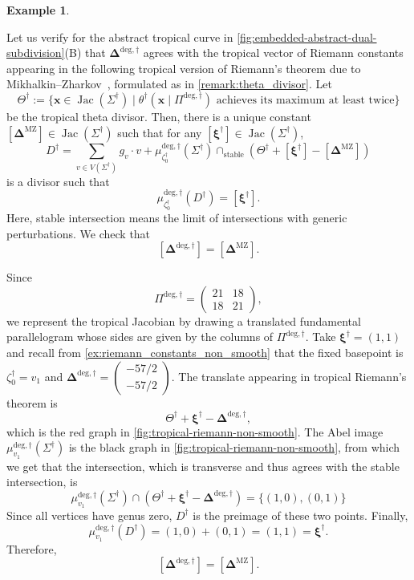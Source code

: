 \documentclass[12pt]{amsart}
\numberwithin{equation}{section}
\theoremstyle{definition}
\newtheorem{example}[theorem]{Example}
\newcommand{\R}{\mathbb{R}}
\def\vertices{V}
\def\divisor{D}
\def\trop{\dagger}
\def\jac{{\operatorname{Jac}}}
\def\divisor{D}
\def\vecRC{\bm{\Delta}}
\def\vecptjac{\bm{\xi}}
\def\ptR{{\bm{x}}} %
\def\Divtr{\divisor^{\trop}}
\def\ptSig{\zeta}
\def\baseptT{{\ptSig_0^\trop}}
\def\mcurve{\Sigma}
\def\tropmcurve{\mcurve^\trop}
\begin{document}
\begin{example}\label{ex:MZequalsours}

Let us verify for the abstract tropical curve in
\cref{fig:embedded-abstract-dual-subdivision}(B) that
$\vecRC^{\mathrm{deg},\trop}$ agrees with the tropical vector of
Riemann constants appearing in the following tropical version of
Riemann's theorem due to
Mikhalkin--Zharkov~\cite[Theorem~6.5]{MZ}, formulated as in \cref{remark:theta_divisor}.
Let
\[
\Theta^\trop
:=
\{
\ptR\in\jac(\tropmcurve)
\mid
\theta^\trop(\ptR\mid\Pi^{\mathrm{deg},\trop})
\text{ achieves its maximum at least twice}
\}
\]
be the tropical theta divisor. Then, there is a unique constant
$[\vecRC^{\mathrm{MZ}}] \in \jac(\tropmcurve)$ such that for any
$[\vecptjac^\trop]\in\jac(\tropmcurve)$,
\[
\Divtr
=
\sum_{v\in\vertices(\tropmcurve)}
g_v\cdot v
+
\mu^{\mathrm{deg},\trop}_{\baseptT}(\tropmcurve)
\cap_{\mathrm{stable}}
\left(
\Theta^\trop
+
[\vecptjac^\trop]
-
[\vecRC^{\mathrm{MZ}}]
\right)
\]
is a divisor such that
\[
\mu^{\mathrm{deg},\trop}_{\baseptT}(\Divtr)
=
[\vecptjac^\trop].
\]
Here, stable intersection means the limit of intersections with generic
perturbations. We check that
\[
[\vecRC^{\mathrm{deg},\trop}]
=
[\vecRC^{\mathrm{MZ}}].
\]

Since
\[
\Pi^{\mathrm{deg},\trop}
=
\begin{pmatrix}
21&18\\
18&21
\end{pmatrix},
\]
we represent the tropical Jacobian by drawing a translated fundamental
parallelogram whose sides are given by the columns of
$\Pi^{\mathrm{deg},\trop}$.
Take
$
\vecptjac^\trop=(1,1)
$
and recall from
\cref{ex:riemann_constants_non_smooth} that the fixed basepoint is
$\baseptT=v_1$ and
$
\vecRC^{\mathrm{deg},\trop}
=
\begin{pmatrix}
-{57}/{2}\\
-{57}/{2}
\end{pmatrix}.
$
The translate appearing in tropical Riemann's theorem is
\[
\Theta^\trop
+
\vecptjac^\trop
-
\vecRC^{\mathrm{deg},\trop},
\]
which is the red graph in
\cref{fig:tropical-riemann-non-smooth}.
The Abel image
$\mu_{v_1}^{\mathrm{deg},\trop}(\tropmcurve)$
is the black graph in
\cref{fig:tropical-riemann-non-smooth}, from which we get that the
intersection, which is transverse and thus agrees with the stable
intersection, is
\[
\mu_{v_1}^{\mathrm{deg},\trop}(\tropmcurve)
\cap
\left(
\Theta^\trop
+
\vecptjac^\trop
-
\vecRC^{\mathrm{deg},\trop}
\right)
=
\{
(1,0),(0,1)
\}
\]
Since all vertices have genus zero, $\Divtr$ is the preimage of these two points. Finally,
\[
\mu^{\mathrm{deg},\trop}_{v_1}(\Divtr)
=
(1,0)+(0,1)
=
(1,1)
=
\vecptjac^\trop.
\]
Therefore,
\[
[\vecRC^{\mathrm{deg},\trop}]
=
[\vecRC^{\mathrm{MZ}}].
\]

\end{example}
\end{document}
